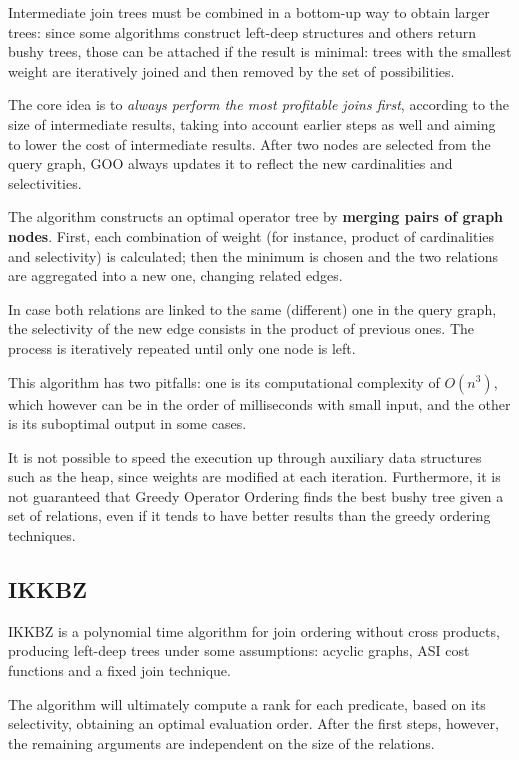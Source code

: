Intermediate join trees must be combined in a bottom-up way to obtain larger trees: since some algorithms construct left-deep structures and others return bushy trees, those can be attached if the result is minimal: trees with the smallest weight are iteratively joined and then removed by the set of possibilities. 

The core idea is to \textit{always perform the most profitable joins first}, according to the size of intermediate results, taking into account earlier steps as well and aiming to lower the cost of intermediate results. After two nodes are selected from the query graph, GOO always updates it to reflect the new cardinalities and selectivities.

The algorithm constructs an optimal operator tree by \textbf{merging pairs of graph nodes}. First, each combination of weight (for instance, product of cardinalities and selectivity) is calculated; then the minimum is chosen and the two relations are aggregated into a new one, changing related edges. 

In case both relations are linked to the same (different) one in the query graph, the selectivity of the new edge consists in the product of previous ones. The process is iteratively repeated until only one node is left. 

This algorithm has two pitfalls: one is its computational complexity of $O(n^3)$, which however can be in the order of milliseconds with small input, and the other is its suboptimal output in some cases.

It is not possible to speed the execution up through auxiliary data structures such as the heap, since weights are modified at each iteration. Furthermore, it is not guaranteed that Greedy Operator Ordering finds the best bushy tree given a set of relations, even if it tends to have better results than the greedy ordering techniques.

\subsection{IKKBZ}
IKKBZ is a polynomial time algorithm for join ordering without cross products, producing left-deep trees under some assumptions: acyclic graphs, ASI cost functions and a fixed join technique.

The algorithm will ultimately compute a rank for each predicate, based on its selectivity, obtaining an optimal evaluation order. After the first steps, however, the remaining arguments are independent on the size of the relations.

